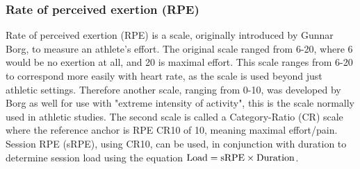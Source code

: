 \subsubsection{Rate of perceived exertion (RPE)} \label{subsub:rpe}
Rate of perceived exertion (RPE) is a scale, originally introduced by Gunnar Borg, to measure an athlete's effort. The original scale ranged from 6-20, where 6 would be no exertion at all, and 20 is maximal effort. This scale ranges from 6-20 to correspond more easily with heart rate, as the scale is used beyond just athletic settings. Therefore another scale, ranging from 0-10, was developed by Borg as well for use with "extreme intensity of activity", this is the scale normally used in athletic studies. The second scale is called a Category-Ratio (CR) scale where the reference anchor is RPE CR10 of 10, meaning maximal effort/pain. Session RPE (sRPE), using CR10, can be used, in conjunction with duration to determine session load \cite{Williams2017} using the equation $\textnormal{Load} = \textnormal{sRPE} \times \textnormal{Duration}$.

